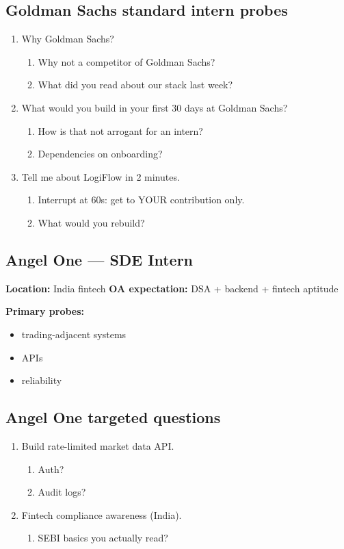 \documentclass[9pt,a4paper]{article}
\begin{document}
\subsection{Goldman Sachs standard intern probes}
\begin{enumerate}[label=\textbf{Q\arabic*:}, leftmargin=*]
  \item Why Goldman Sachs?
  \begin{enumerate}[label=\textit{FU\arabic*:}, leftmargin=2em]
    \item Why not a competitor of Goldman Sachs?
    \item What did you read about our stack last week?
  \end{enumerate}
  \item What would you build in your first 30 days at Goldman Sachs?
  \begin{enumerate}[label=\textit{FU\arabic*:}, leftmargin=2em]
    \item How is that not arrogant for an intern?
    \item Dependencies on onboarding?
  \end{enumerate}
  \item Tell me about LogiFlow in 2 minutes.
  \begin{enumerate}[label=\textit{FU\arabic*:}, leftmargin=2em]
    \item Interrupt at 60s: get to YOUR contribution only.
    \item What would you rebuild?
  \end{enumerate}
\end{enumerate}
\newpage
\subsection{Angel One --- SDE Intern}
\textbf{Location:} India fintech \quad \textbf{OA expectation:} DSA + backend + fintech aptitude

\textbf{Primary probes:}
\begin{itemize}
  \item trading-adjacent systems
  \item APIs
  \item reliability
\end{itemize}

\subsection{Angel One targeted questions}
\begin{enumerate}[label=\textbf{Q\arabic*:}, leftmargin=*]
  \item Build rate-limited market data API.
  \begin{enumerate}[label=\textit{FU\arabic*:}, leftmargin=2em]
    \item Auth?
    \item Audit logs?
  \end{enumerate}
  \item Fintech compliance awareness (India).
  \begin{enumerate}[label=\textit{FU\arabic*:}, leftmargin=2em]
    \item SEBI basics you actually read?
  \end{enumerate}
\end{enumerate}
\end{document}

